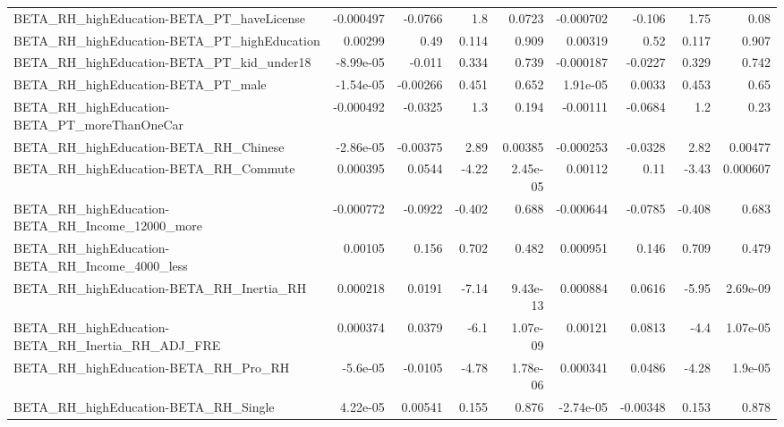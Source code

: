 \begin{tabular}{lrrrrrrrr}
BETA\_RH\_highEducation-BETA\_PT\_haveLicense          &   -0.000497 &      -0.0766 &      1.8 &   0.0723 &  -0.000702 &      -0.106 &         1.75 &          0.08 \\
BETA\_RH\_highEducation-BETA\_PT\_highEducation        &     0.00299 &         0.49 &    0.114 &    0.909 &    0.00319 &        0.52 &        0.117 &         0.907 \\
BETA\_RH\_highEducation-BETA\_PT\_kid\_under18          &   -8.99e-05 &       -0.011 &    0.334 &    0.739 &  -0.000187 &     -0.0227 &        0.329 &         0.742 \\
BETA\_RH\_highEducation-BETA\_PT\_male                 &   -1.54e-05 &     -0.00266 &    0.451 &    0.652 &   1.91e-05 &      0.0033 &        0.453 &          0.65 \\
BETA\_RH\_highEducation-BETA\_PT\_moreThanOneCar       &   -0.000492 &      -0.0325 &      1.3 &    0.194 &   -0.00111 &     -0.0684 &          1.2 &          0.23 \\
BETA\_RH\_highEducation-BETA\_RH\_Chinese              &   -2.86e-05 &     -0.00375 &     2.89 &  0.00385 &  -0.000253 &     -0.0328 &         2.82 &       0.00477 \\
BETA\_RH\_highEducation-BETA\_RH\_Commute              &    0.000395 &       0.0544 &    -4.22 & 2.45e-05 &    0.00112 &        0.11 &        -3.43 &      0.000607 \\
BETA\_RH\_highEducation-BETA\_RH\_Income\_12000\_more    &   -0.000772 &      -0.0922 &   -0.402 &    0.688 &  -0.000644 &     -0.0785 &       -0.408 &         0.683 \\
BETA\_RH\_highEducation-BETA\_RH\_Income\_4000\_less     &     0.00105 &        0.156 &    0.702 &    0.482 &   0.000951 &       0.146 &        0.709 &         0.479 \\
BETA\_RH\_highEducation-BETA\_RH\_Inertia\_RH           &    0.000218 &       0.0191 &    -7.14 & 9.43e-13 &   0.000884 &      0.0616 &        -5.95 &      2.69e-09 \\
BETA\_RH\_highEducation-BETA\_RH\_Inertia\_RH\_ADJ\_FRE   &    0.000374 &       0.0379 &     -6.1 & 1.07e-09 &    0.00121 &      0.0813 &         -4.4 &      1.07e-05 \\
BETA\_RH\_highEducation-BETA\_RH\_Pro\_RH               &    -5.6e-05 &      -0.0105 &    -4.78 & 1.78e-06 &   0.000341 &      0.0486 &        -4.28 &       1.9e-05 \\
BETA\_RH\_highEducation-BETA\_RH\_Single               &    4.22e-05 &      0.00541 &    0.155 &    0.876 &  -2.74e-05 &    -0.00348 &        0.153 &         0.878 \\

\end{tabular}
